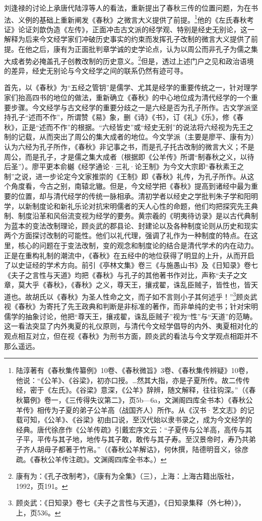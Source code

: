 \documentclass[a4paper, 12pt, openright]{ctexbook}
\begin{document}
刘逢禄的讨论上承唐代陆淳等人的看法，重新提出了春秋三传的位置问题，为在书法、义例的基础上重新阐发《春秋》之微言大义提供了前提。\footnote{陆淳著有《春秋集传纂例》10卷、《春秋微旨》3卷、《春秋集传辨疑》10卷，他说：“《公羊》、《谷梁》，初亦口授。…然其大指，亦是子夏所传。故二传传经，密于《左氏》。《谷梁》意深，《公羊》辞辨，随文解释，往往钩深。”（《春秋纂例》卷一，《三传得失议第二》，页5b—6a，文渊阁四库全书本）《春秋公羊传》相传为子夏的弟子公羊高（战国齐人）所作。从《汉书·艺文志》的记载可知，《公羊》、《谷梁》初由口说，至汉代始以隶书录之，成为今文经学的经典。唐代徐彦作《公羊传疏》引戴宏序文云：“子夏传与公羊高，高传与其子平，平传与其子地，地传与其子敢，敢传与其子寿。至汉景帝时，寿乃共弟子齐人胡毋子都著于竹帛。”（《春秋公羊解诂》，何休撰，陆德明音义，徐彦疏。《春秋公羊传注疏》。文渊阁四库全书本。）}他的《左氏春秋考证》论证刘歆伪造《左传》，正面冲击古文派的经学观、特别是经史无别论，这一解释为后来今文经学家们冲破历史事实的约束而发挥孔子改制的微言大义提供了前提。在他之后，康有为正面批判章学诚的史学论点，认为以周公而非孔子为儒之集大成者势必掩盖孔子创教改制的历史意义。\footnote{康有为：《孔子改制考》，《康有为全集》（三），上海：上海古籍出版社，1992，页191。}但是，透过上述门户之见和政治语境的差异，经史无别论与今文经学之间的联系仍然有迹可寻。

首先，以《春秋》为“五经之管钥”是儒学、尤其是经学的重要传统之一，针对理学家们抬高四书的地位的做法，重新确立《春秋》的中心地位成为清代经学的一个重要步骤。今文经学与古文经学的重要分歧之一是六经是否为孔子所作。古文学派坚持孔子“述而不作”，所谓赞《易》象，删《诗》《书》，订《礼》《乐》，修《春秋》，正是“述而不作”的根据。“六经皆史”或“经史无别”的说法将六经视为先王之制的记载，从而突出了周公的集大成者的地位。今文学派（主要是廖平、康有为）认为六经为孔子所作，《春秋》非记事之书，而是孔子托古改制的微言大义；不是周公，而是孔子，才是儒之集大成者（根据即《公羊传》所谓“制春秋之义，以待后圣”）。廖平更本俞樾《经学通论·三礼·论王制》为今文大宗即“春秋素王之制”之说，进一步论定今文家推崇的《王制》即《春秋》礼传，为孔子所作。从这个角度看，今古之别，南辕北辙。但是，今文经学把《春秋》提高到诸经中最为重要的位置，却与清代经学的传统一脉相承。清初学者以经史之学批判朱子学和阳明学，以新制度论和新礼乐论对抗宋明儒者的天人心性的命题，他们均把探究先王典制、制度沿革和风俗流变视为经学的要务。黄宗羲的《明夷待访录》是以古代典制为蓝本的变法改制理论，顾炎武的郡县论、封建论以及各种制度论则从历史和现实两个方面探讨改制的可能性。他们以礼代理，强调了礼作为一种制度的特点。在这里，核心的问题在于变法改制，变的观念和制度论的结合是清代学术的内在动力。正是在重构礼制的潮流中，《春秋》在五经中的地位获得了明显的上升，从而开启了以史证经的学术方向。前引《亭林文集》卷三《与施愚山书》及《日知录》卷七《夫子之言性与天道》均把《春秋》与孔子的其他著书作对比，声称“夫子之文章，莫大乎《春秋》，《春秋》之义，尊天王，攘戎翟，诛乱臣贼子，皆性也，皆天道也。故胡氏以《春秋》为圣人性命之文，而子如不言则小子其何述乎！”\footnote{顾炎武：《日知录》卷七《夫子之言性与天道》，《日知录集释（外七种）》，上，页536。}顾炎武视《春秋》为寄托了先王政典和判断是非标准的著作，而非单纯的史书；针对宋明儒学的抽象讨论，他把“尊天王，攘戎翟，诛乱臣贼子”视为“性”与“天道”的范畴。这一看法突显了内外夷夏的礼仪原则，与清代今文经学倡导的内外、夷夏相对化的观点相互对立，但在视《春秋》为刑书方面，顾炎武的看法与今文学观点相距并不那么遥远。
\end{document}

